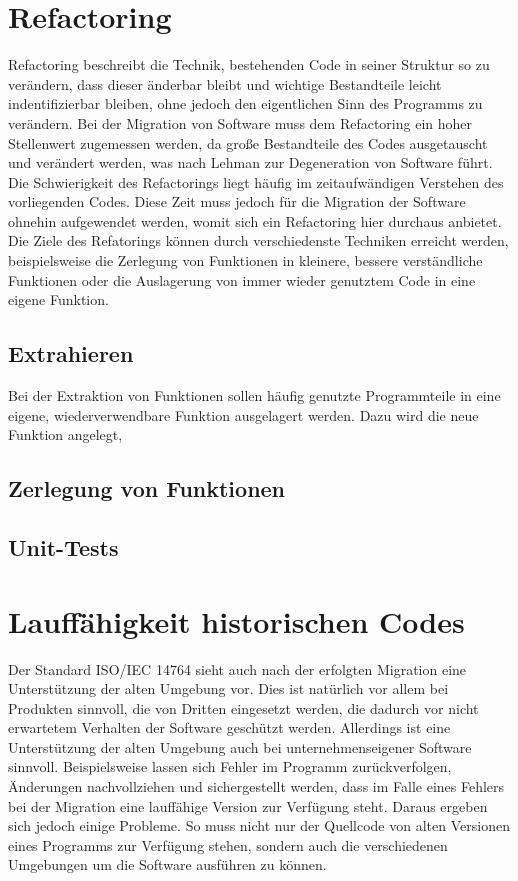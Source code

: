 \section{Refactoring}
    Refactoring beschreibt die Technik, bestehenden Code in seiner Struktur so zu verändern, dass dieser änderbar bleibt und wichtige Bestandteile leicht indentifizierbar 
    bleiben, ohne jedoch den eigentlichen Sinn des Programms zu verändern. \cite{fowler_refactoring_1999} Bei der Migration von Software muss dem Refactoring ein hoher Stellenwert zugemessen werden, 
    da große Bestandteile des Codes ausgetauscht und verändert werden, was nach Lehman \cite[S. 1060-1076]{lehman_programs_1980} zur Degeneration von Software führt.
    Die Schwierigkeit des Refactorings liegt häufig im zeitaufwändigen Verstehen des vorliegenden Codes. Diese Zeit muss jedoch für die Migration der Software ohnehin 
    aufgewendet werden, womit sich ein Refactoring hier durchaus anbietet.
    Die Ziele des Refatorings können durch verschiedenste Techniken erreicht werden, beispielsweise die Zerlegung von Funktionen in kleinere, bessere verständliche 
    Funktionen oder die Auslagerung von immer wieder genutztem Code in eine eigene Funktion.
    \subsection{Extrahieren}
        Bei der Extraktion von Funktionen sollen häufig genutzte Programmteile in eine eigene, wiederverwendbare Funktion ausgelagert werden. Dazu wird die neue Funktion
        angelegt, 
    \subsection{Zerlegung von Funktionen}
    \subsection{Unit-Tests}

\section{Lauffähigkeit historischen Codes}
    Der Standard ISO/IEC 14764 sieht auch nach der erfolgten Migration eine Unterstützung der alten Umgebung vor. Dies ist natürlich vor allem bei Produkten sinnvoll, 
    die von Dritten eingesetzt werden, die dadurch vor nicht erwartetem Verhalten der Software geschützt werden. Allerdings ist eine Unterstützung der alten Umgebung 
    auch bei unternehmenseigener Software sinnvoll. Beispielsweise lassen sich Fehler im Programm zurückverfolgen, Änderungen nachvollziehen und sichergestellt werden,
    dass im Falle eines Fehlers bei der Migration eine lauffähige Version zur Verfügung steht. Daraus ergeben sich jedoch einige Probleme. So muss nicht nur der Quellcode 
    von alten Versionen eines Programms zur Verfügung stehen, sondern auch die verschiedenen Umgebungen um die Software ausführen zu können.
